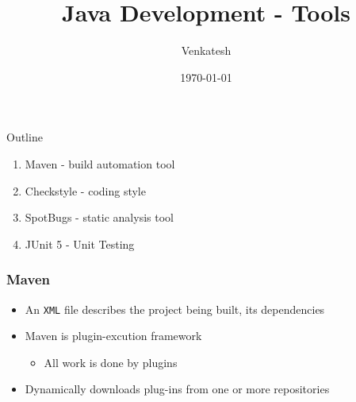 \documentclass{beamer}
\title{Java Development - Tools} %
\author{Venkatesh} %
\institute{WDC}
\date{\today} %
\begin{document}
\lstset{
    basicstyle=\ttfamily\footnotesize,
    breaklines=true
    breakatwhitespace=true,
    language=C++,
    columns=fullflexible,
    keepspaces=true,
    breaklines=true,
    tabsize=3, 
    showstringspaces=false,
    extendedchars=true
    inputencoding=utf8
}

\begin{frame}
\titlepage %
\end{frame}

\begin{frame}{Outline}

  \begin{enumerate}

   \item Maven       - build automation tool
   \item Checkstyle  - coding style       
   \item SpotBugs    - static analysis tool
   \item JUnit 5     - Unit Testing

  \end{enumerate}
\end{frame}




\begin{frame}[fragile]
\frametitle{Maven}

\begin{itemize}
\item An \texttt{XML} file describes the project being built, its dependencies
\item Maven is plugin-excution framework
    \begin{itemize}
        \item All work is done by plugins
    \end{itemize}
\item Dynamically downloads plug-ins from one or more repositories
\end{itemize}

\end{frame}
\end{document}
